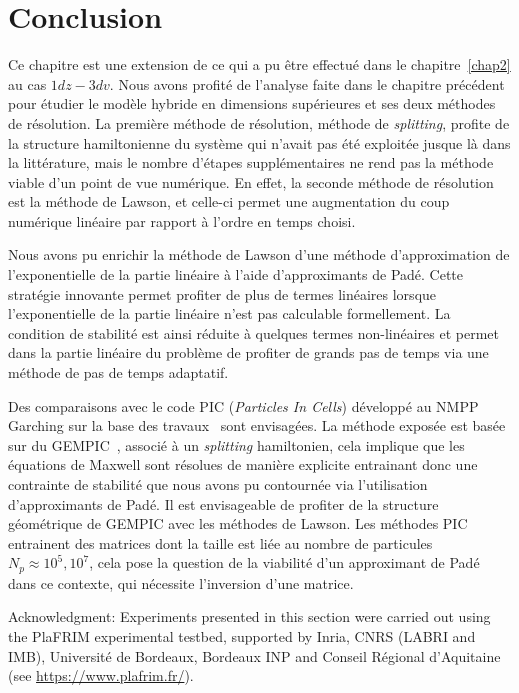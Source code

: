 
\section{Conclusion}

Ce chapitre est une extension de ce qui a pu être effectué dans le chapitre~\ref{chap2} au cas $1dz-3dv$. Nous avons profité de l'analyse faite dans le chapitre précédent pour étudier le modèle hybride en dimensions supérieures et ses deux méthodes de résolution. La première méthode de résolution, méthode de \emph{splitting}, profite de la structure hamiltonienne du système qui n'avait pas été exploitée jusque là dans la littérature, mais le nombre d'étapes supplémentaires ne rend pas la méthode viable d'un point de vue numérique. En effet, la seconde méthode de résolution est la méthode de Lawson, et celle-ci permet une augmentation du coup numérique linéaire par rapport à l'ordre en temps choisi.

Nous avons pu enrichir la méthode de Lawson d'une méthode d'approximation de l'exponentielle de la partie linéaire à l'aide d'approximants de Padé. Cette stratégie innovante permet profiter de plus de termes linéaires lorsque l'exponentielle de la partie linéaire n'est pas calculable formellement. La condition de stabilité est ainsi réduite à quelques termes non-linéaires et permet dans la partie linéaire du problème de profiter de grands pas de temps via une méthode de pas de temps adaptatif.

Des comparaisons avec le code PIC (\emph{Particles In Cells}) développé au NMPP Garching sur la base des travaux~\cite{Holderied:2020} sont envisagées. La méthode exposée est basée sur du GEMPIC~\cite{Kraus:2017}, associé à un \emph{splitting} hamiltonien, cela implique que les équations de Maxwell sont résolues de manière explicite entrainant donc une contrainte de stabilité que nous avons pu contournée via l'utilisation d'approximants de Padé. Il est envisageable de profiter de la structure géométrique de GEMPIC avec les méthodes de Lawson. Les méthodes PIC entrainent des matrices dont la taille est liée au nombre de particules $N_p\approx 10^5,10^7$, cela pose la question de la viabilité d'un approximant de Padé dans ce contexte, qui nécessite l'inversion d'une matrice.

\vfill

\begin{otherlanguage}{english}
Acknowledgment: Experiments presented in this section were carried out using the PlaFRIM experimental testbed, supported by Inria, CNRS (LABRI and IMB), Université de Bordeaux, Bordeaux INP and Conseil Régional d’Aquitaine (see \url{https://www.plafrim.fr/}).
\end{otherlanguage}

